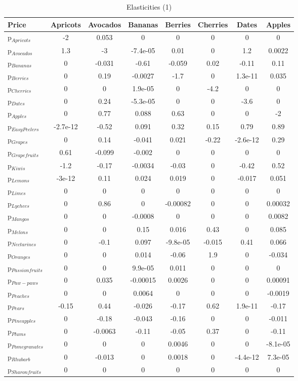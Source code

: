 \documentclass[11pt]{article}
\begin{document}
\begin{table}[h]
\caption{Elasticities (1)}
\label{table:elasticities 1}
\begin{center}
\begin{tabular}{lccccccc} \hline \hline
Price &Apricots &Avocados &Bananas &Berries &Cherries &Dates &Apples \\ \hline
p$_{Apricots}$ &-2 &0.053 &0 &0 &0 &0 &0 \\
p$_{Avocados}$ &1.3 &-3 &-7.4e-05 &0.01 &0 &1.2 &0.0022 \\
p$_{Bananas}$ &0 &-0.031 &-0.61 &-0.059 &0.02 &-0.11 &0.11 \\
p$_{Berries}$ &0 &0.19 &-0.0027 &-1.7 &0 &1.3e-11 &0.035 \\
p$_{Cherries}$ &0 &0 &1.9e-05 &0 &-4.2 &0 &0 \\
p$_{Dates}$ &0 &0.24 &-5.3e-05 &0 &0 &-3.6 &0 \\
p$_{Apples}$ &0 &0.77 &0.088 &0.63 &0 &0 &-2 \\
p$_{Easy Peelers}$ &-2.7e-12 &-0.52 &0.091 &0.32 &0.15 &0.79 &0.89 \\
p$_{Grapes}$ &0 &0.14 &-0.041 &0.021 &-0.22 &-2.6e-12 &0.29 \\
p$_{Grapefruits}$ &0.61 &-0.099 &-0.002 &0 &0 &0 &0 \\
p$_{Kiwis}$ &-1.2 &-0.17 &-0.0034 &-0.03 &0 &-0.42 &0.52 \\
p$_{Lemons}$ &-3e-12 &0.11 &0.024 &0.019 &0 &-0.017 &0.051 \\
p$_{Limes}$ &0 &0 &0 &0 &0 &0 &0 \\
p$_{Lychees}$ &0 &0.86 &0 &-0.00082 &0 &0 &0.00032 \\
p$_{Mangos}$ &0 &0 &-0.0008 &0 &0 &0 &0.0082 \\
p$_{Melons}$ &0 &0 &0.15 &0.016 &0.43 &0 &0.085 \\
p$_{Nectarines}$ &0 &-0.1 &0.097 &-9.8e-05 &-0.015 &0.41 &0.066 \\
p$_{Oranges}$ &0 &0 &0.014 &-0.06 &1.9 &0 &-0.034 \\
p$_{Passion fruits}$ &0 &0 &9.9e-05 &0.011 &0 &0 &0 \\
p$_{Paw-paws}$ &0 &0.035 &-0.00015 &0.0026 &0 &0 &0.00091 \\
p$_{Peaches}$ &0 &0 &0.0064 &0 &0 &0 &-0.0019 \\
p$_{Pears}$ &-0.15 &0.44 &-0.026 &-0.17 &0.62 &1.9e-11 &-0.17 \\
p$_{Pineapples}$ &0 &-0.18 &-0.043 &-0.16 &0 &0 &-0.011 \\
p$_{Plums}$ &0 &-0.0063 &-0.11 &-0.05 &0.37 &0 &-0.11 \\
p$_{Pomegranates}$ &0 &0 &0 &0.0046 &0 &0 &-8.1e-05 \\
p$_{Rhubarb}$ &0 &-0.013 &0 &0.0018 &0 &-4.4e-12 &7.3e-05 \\
p$_{Sharon fruits}$ &0 &0 &0 &0 &0 &0 &0 \\
\end{tabular}
\end{center}
\end{table}
\end{document}
